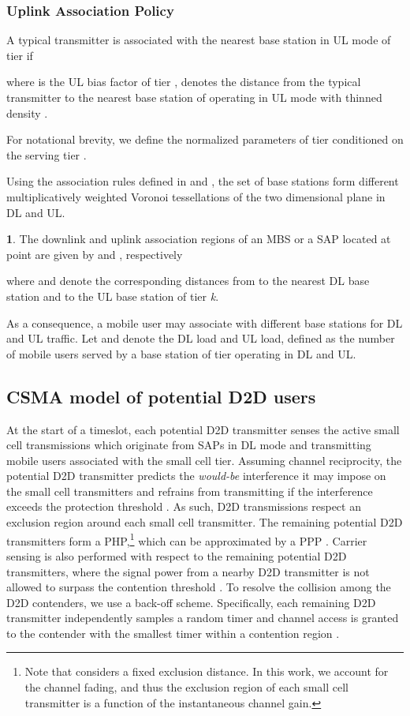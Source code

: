 \documentclass[twocolumn,english]{IEEEtran}
\theoremstyle{plain}
\theoremstyle{definition}
\newtheorem{defn}[thm]{\protect\definitionname}
\providecommand{\definitionname}{Definition}
\begin{document}
\subsubsection{Uplink Association Policy}

A typical transmitter is associated with the nearest base station
in UL mode of tier  if

where  is the UL bias factor of tier , 
denotes the distance from the typical transmitter to the nearest base
station of  operating in UL mode with thinned density .

For notational brevity, we define the normalized parameters of tier
 conditioned on the serving tier .




Using the association rules defined in 
and , the set of base stations form different
multiplicatively weighted Voronoi tessellations of the two dimensional
plane in DL and UL.
\begin{defn}
The downlink and uplink association regions of an MBS or a SAP located
at point  are given by  and ,
respectively \cite{OIHN}


where  and 
denote the corresponding distances from  to the nearest DL base
station and to the UL base station of tier \emph{k}.
\end{defn}
As a consequence, a mobile user may associate with different base
stations for DL and UL traffic. Let\textbf{ }
and\textbf{ } denote the DL load and
UL load, defined as the number of mobile users served by a base station
of tier  operating in DL and UL.


\subsection{CSMA model of potential D2D users}

At the start of a timeslot, each potential D2D transmitter senses
the active small cell transmissions which originate from SAPs in DL
mode and transmitting mobile users associated with the small cell
tier. Assuming channel reciprocity, the potential D2D transmitter
predicts the \emph{would-be }interference it may impose on the small
cell transmitters and refrains from transmitting if the interference
exceeds the protection threshold . As such, D2D
transmissions respect an exclusion region around each small cell transmitter.
The remaining potential D2D transmitters form a PHP,\emph{}\footnote{Note that \cite{IAOI} considers a fixed exclusion distance. In this
work, we account for the channel fading, and thus the exclusion region
of each small cell transmitter is a function of the instantaneous
channel gain.} which can be approximated by a PPP \cite{IAOI}. Carrier sensing
is also performed with respect to the remaining potential D2D transmitters,
where the signal power from a nearby D2D transmitter is not allowed
to surpass the contention threshold . To resolve
the collision among the D2D contenders, we use a back-off scheme.
Specifically, each remaining D2D transmitter independently samples
a random timer  and channel access is
granted to the contender with the smallest timer within a contention
region \cite{ASGM}.
\end{document}

